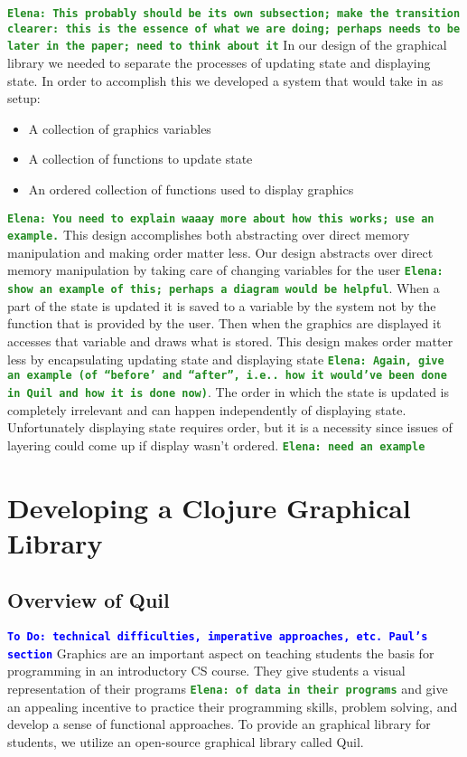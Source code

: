 \documentclass[12pt]{article}
\newcommand{\comment}[1]{{\bf \tt  {#1}}}
\newcommand{\emcomment}[1]{\textcolor{ForestGreen}{\comment{Elena: {#1}}}}
\newcommand{\todo}[1]{\textcolor{blue}{\comment{To Do: {#1}}}}
\begin{document}
\emcomment{This probably should be its own subsection; make the transition clearer: this is the essence of what we are doing; perhaps needs to be later in the paper; need to think about it}
In our design of the graphical library we needed to separate the processes of updating state and displaying state. In order to accomplish this we developed a system that would take in as setup: 
\begin{itemize}
	\item A collection of graphics variables 
	\item A collection of functions to update state
	\item An ordered collection of functions used to display graphics 
\end{itemize}
\emcomment{You need to explain waaay more about how this works; use an example.}
This design accomplishes both abstracting over direct memory manipulation and making order matter less. Our design abstracts over direct memory manipulation by taking care of changing variables for the user \emcomment{show an example of this; perhaps a diagram would be helpful}. When a part of the state is updated it is saved to a variable by the system not by the function that is provided by the user. Then when the graphics are displayed it accesses that variable and draws what is stored. This design makes order matter less by encapsulating updating state and displaying state \emcomment{Again, give an example (of ``before' and ``after'', i.e.. how it would've been done in Quil and how it is done now)}. The order in which the state is updated is completely irrelevant and can happen independently of displaying state. Unfortunately displaying state requires order, but it is a necessity since issues of layering could come up if display wasn't ordered.
\emcomment{need an example}

\section{Developing a Clojure Graphical Library}\label{sec:library}

\subsection{Overview of Quil}\label{subsec:quil}
\todo{technical difficulties, imperative approaches, etc. Paul's section}
Graphics are an important aspect on teaching students the basis for programming in an introductory CS course. They give students a visual representation of their programs \emcomment{of data in their programs} and give an appealing incentive to practice their programming skills, problem solving, and develop a sense of functional approaches. %
To provide an graphical library for students, we utilize an open-source graphical library called Quil.
\end{document}
